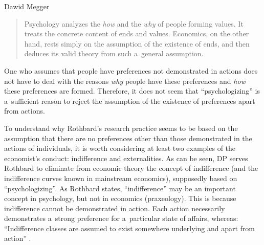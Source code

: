 \begin{artengenv}{Dawid Megger}
\begin{quote}
Psychology analyzes the \textit{how} and the \textit{why} of people forming values. It treats the concrete content of ends and values. Economics, on the other hand, rests simply on the assumption of the existence of ends, and then deduces its valid theory from such a~general assumption. 
\parencite[][pp.296–297]{rothbard_present_2011}%
\end{quote}




One who assumes that people have preferences not demonstrated in actions does not have to deal with the reasons \textit{why} people have these preferences and \textit{how} these preferences are formed. Therefore, it does not seem that ``psychologizing'' is a~sufficient reason to reject the assumption of the existence of preferences apart from actions.



To understand why Rothbard's research practice seems to be based on the assumption that there are no preferences other than those demonstrated in the actions of individuals, it is worth considering at least two examples of the economist's conduct: indifference and externalities. As can be seen, DP serves Rothbard to eliminate from economic theory the concept of indifference (and the indifference curves known in mainstream economics), supposedly based on ``psychologizing''. As Rothbard states, ``indifference'' may be an important concept in psychology, but not in economics (praxeology). This is because indifference cannot be demonstrated in action. Each action necessarily demonstrates a~strong preference for a~particular state of affairs, whereas: ``Indifference classes are assumed to exist somewhere underlying and apart from action'' 
\parencite[][pp.304–305]{rothbard_present_2011}.%





\end{artengenv}

